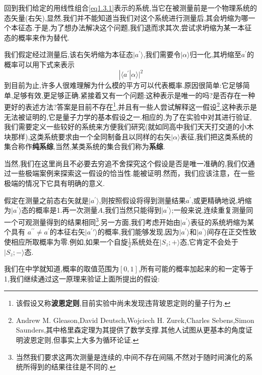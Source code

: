 回到我们给定的用线性组合\ref{eq1.3.1}表示的系统,当它在被测量前是一个物理系统的态矢量(右矢),显然,我们并不能知道当我们对这个系统进行测量后,其会坍缩为哪一个本征态.于是,为了想办法解决这个问题,我们退而求其次,尝试求坍缩为某一本征态的概率来作为替代.

我们假定经过测量后,该右矢坍缩为本征态$|a^{'}\rangle$,我们需要令$|\alpha\rangle$归一化,其坍缩至$a^{'}$的概率可以用下式来表示
\begin{equation}
	|\langle a^{\prime}|\alpha\rangle|^{2}
\end{equation}
到目前为止,许多人很难理解为什么模的平方可以代表概率.原因很简单:它足够简单,足够有效,更足够正确.紧接着又有一个问题:这种表示是唯一的吗?是否存在一种更好的表述方法?答案是目前不存在\footnote{该假设又称\textbf{波恩定则},目前实验中尚未发现违背玻恩定则的量子行为.},并且有一些人尝试解释这一假设\footnote{Andrew M. Gleason,David Deutsch,Wojciech H. Zurek,Charles Sebens,Simon Saunders,其中格里森定理为其提供了数学支撑.其他人试图从更基本的角度证明波恩定则,但事实上大多为循环论证.},这种表示是无法被证明的,它是量子力学的基本假设之一.相应的,为了在实验中对其进行验证,我们需要定义一些较好的系统来方便我们研究(就如同高中我们天天打交道的小木块那样),这类系统要求由一个全同制备且以同样的右矢$|\alpha\rangle$表征,我们把这类系统的集合称作\textbf{纯系综},当然,某类系统的集合我们称为\textbf{系综}.

当然,我们在这里尚且不必要去穷追不舍探究这个假设是否是唯一准确的,我们仅通过一些极端案例来探索这一假设的恰当性.能被证明.然而，我们应该注意，在一些极端的情况下它具有明确的意义.

假定在测量之前态右矢就是$|a^\prime\rangle$,则按照假设将得到测量结果$a^\prime$,或更精确地说,坍缩为$|a^{\prime}\rangle$态的概率是1.再一次测量$A$,我们当然只能得到$|a^{\prime}\rangle$;一般来说,连续重复测量同一个可观测量得到的结果相同\footnote{当然我们要求这两次测量是连续的,中间不存在间隔,不然对于随时间演化的系统所得到的结果往往是不同的.}.另一方面,我们考虑开始由$|a^\prime\rangle$表征的系统坍缩为某个具有 $a^{\prime\prime}\neq a^{\prime}$的本征右矢$|a^\prime\prime\rangle$的概率,我们能够发现,因为$|a^\prime\rangle$和$|a^\prime\rangle$间存在正交性致使相应所取概率为零.例如,如果一个自旋$\frac12$系统处在$|S_z;+\rangle$态,它肯定不会处于$|S_{z};-\rangle$态.

我们在中学就知道,概率的取值范围为$[0,1]$,所有可能的概率加起来的和一定等于1,我们继续通过这一原理来验证上面所提出的假设:

